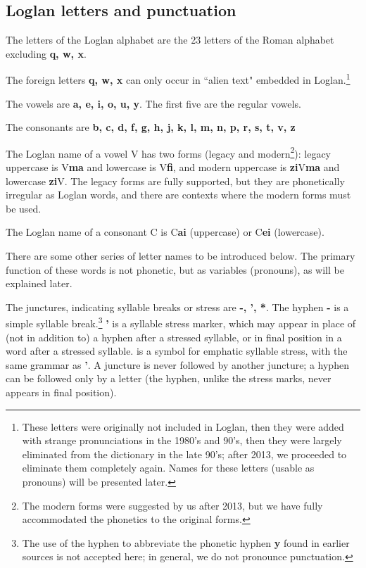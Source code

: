 \documentclass[12pt]{book}
\begin{document}
\subsection{Loglan letters and punctuation}

The letters of the Loglan alphabet are the 23 letters of the Roman alphabet excluding {\bf q, w, x}. 

 The foreign letters {\bf q, w, x} can only occur in ``alien text" embedded in Loglan.\footnote{These letters were originally not included in Loglan, then they were added with strange pronunciations in the 1980's and 90's, then they were largely eliminated from the dictionary in the late 90's;  after 2013, we proceeded to eliminate them completely again.   Names for these letters (usable as pronouns) will be presented later.}

The vowels are {\bf a, e, i, o, u, y}.  The first five are the regular vowels.

The consonants are   {\bf b, c, d, f, g, h, j, k, l, m, n, p, r, s, t, v, z}

The Loglan name of a vowel V has two forms (legacy and modern\footnote{The modern forms were suggested by us after 2013, but we have fully accommodated the phonetics to the original forms.}):  legacy uppercase is V{\bf ma} and lowercase is V{\bf fi}, and modern uppercase is {\bf zi}V{\bf ma} and lowercase {\bf zi}V.  The legacy forms are fully supported, but they are phonetically irregular as Loglan words, and there are contexts where the modern forms must be used.

The Loglan name of a consonant C is C{\bf ai} (uppercase) or C{\bf ei} (lowercase).

There are some other series of letter names to be introduced below.  The primary function of these words is not phonetic, but as variables (pronouns), as will be explained later.

The junctures, indicating syllable breaks or stress are {\bf -, ', *}.  The hyphen {\bf -} is a simple syllable break.\footnote{The use of the hyphen to abbreviate the phonetic hyphen {\bf y} found in earlier sources is not accepted here;  in general, we do not pronounce punctuation.}  {\bf '} is a syllable stress marker, which may appear in place of (not in addition to) a hyphen after a stressed syllable, or in final position in a word after a stressed syllable.  {\bf *} is a symbol for emphatic syllable stress, with the same grammar as {\bf '}.  A juncture is never followed by another juncture;  a hyphen can be followed only by a letter (the hyphen, unlike the stress marks, never appears in final position).
\end{document}
